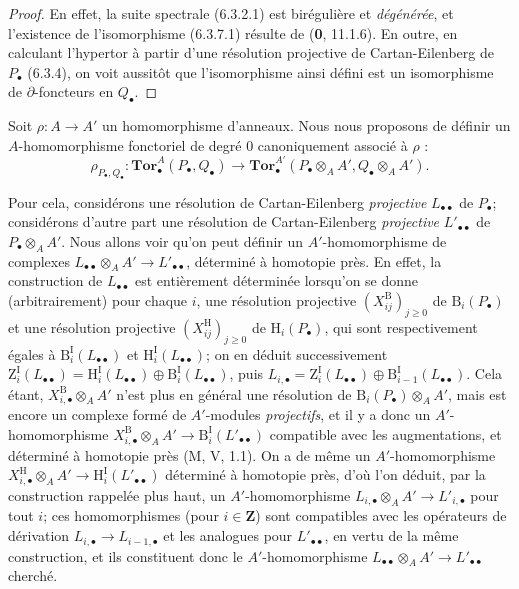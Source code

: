 \begin{proof}
En effet, la suite spectrale (6.3.2.1) est birégulière et \emph{dégénérée}, et
l'existence de l'isomorphisme (6.3.7.1) résulte de (\textbf{0}, 11.1.6). En outre, en
calculant l'hypertor à partir d'une résolution projective de Cartan-Eilenberg
de $P_\bullet$ (6.3.4), on voit aussitôt que l'isomorphisme ainsi défini est
un isomorphisme de $\partial$-foncteurs en $Q_\bullet$.
\end{proof}
\begin{env}[6.3.8]
Soit $\rho:A\to A'$ un homomorphisme d'anneaux. Nous nous proposons de
définir un $A$-homomorphisme fonctoriel de degré 0 canoniquement associé à
$\rho$ :
\[
  \rho_{P_\bullet,Q_\bullet}:
  \mathbf{Tor}_\bullet^A(P_\bullet,Q_\bullet)
  \longrightarrow
  \mathbf{Tor}_\bullet^{A'}
  (P_\bullet\otimes_A A',Q_\bullet\otimes_A A').
  \tag{6.3.8.1}\label{III.6.3.8.1.fr}
\]

Pour cela, considérons une résolution de Cartan-Eilenberg \emph{projective}
$L_{\bullet\bullet}$ de $P_\bullet$; considérons d'autre part une résolution
de Cartan-Eilenberg \emph{projective} $L'_{\bullet\bullet}$ de
$P_\bullet\otimes_A A'$. Nous allons voir qu'on peut définir un
$A'$-homomorphisme de complexes
$L_{\bullet\bullet}\otimes_A A'\to L'_{\bullet\bullet}$, déterminé à
homotopie près. En effet, la construction de $L_{\bullet\bullet}$ est
entièrement déterminée lorsqu'on se donne (arbitrairement) pour chaque $i$,
une résolution projective $(X_{ij}^{\mathrm B})_{j\geqslant0}$ de
$\mathrm B_i(P_\bullet)$ et une résolution projective
$(X_{ij}^{\mathrm H})_{j\geqslant0}$ de $\mathrm H_i(P_\bullet)$, qui sont
respectivement égales à $\mathrm B_i^{\mathrm I}(L_{\bullet\bullet})$ et
$\mathrm H_i^{\mathrm I}(L_{\bullet\bullet})$; on en déduit successivement
$\mathrm Z_i^{\mathrm I}(L_{\bullet\bullet})
=\mathrm H_i^{\mathrm I}(L_{\bullet\bullet})
\oplus\mathrm B_i^{\mathrm I}(L_{\bullet\bullet})$, puis
$L_{i,\bullet}=\mathrm Z_i^{\mathrm I}(L_{\bullet\bullet})
\oplus\mathrm B_{i-1}^{\mathrm I}(L_{\bullet\bullet})$. Cela étant, $X_{i,\bullet}^{\mathrm B}\otimes_A A'$ n'est plus en général
une résolution de $\mathrm B_i(P_\bullet)\otimes_A A'$, mais est encore un
complexe formé de $A'$-modules \emph{projectifs}, et il y a donc un
$A'$-homomorphisme
$X_{i,\bullet}^{\mathrm B}\otimes_A A'
\to\mathrm B_i^{\mathrm I}(L'_{\bullet\bullet})$
compatible avec les augmentations, et déterminé à homotopie près
(M, V, 1.1). On a de même un $A'$-homomorphisme
$X_{i,\bullet}^{\mathrm H}\otimes_A A'
\to\mathrm H_i^{\mathrm I}(L'_{\bullet\bullet})$
déterminé à homotopie près, d'où l'on déduit, par la construction rappelée
plus haut, un $A'$-homomorphisme
$L_{i,\bullet}\otimes_A A'\to L'_{i,\bullet}$ pour tout $i$; ces
homomorphismes (pour $i\in\mathbf Z$) sont compatibles avec les opérateurs de
dérivation $L_{i,\bullet}\to L_{i-1,\bullet}$ et les analogues pour
$L'_{\bullet\bullet}$, en vertu de la même construction, et ils constituent
donc le $A'$-homomorphisme
$L_{\bullet\bullet}\otimes_A A'\to L'_{\bullet\bullet}$ cherché.


\end{env}
